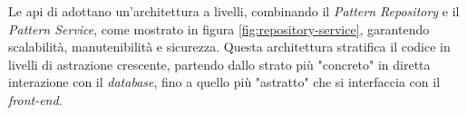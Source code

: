 Le \gls{api} di {\movi} adottano un'architettura a livelli, combinando il \textit{Pattern Repository} e il \textit{Pattern Service}, 
come mostrato in figura \ref{fig:repository-service}, garantendo scalabilità, manutenibilità e sicurezza.
Questa architettura stratifica il codice in livelli di astrazione crescente, 
partendo dallo strato più "concreto" in diretta interazione con il \textit{database}, fino a quello più 
"astratto" che si interfaccia con il \textit{front-end}.